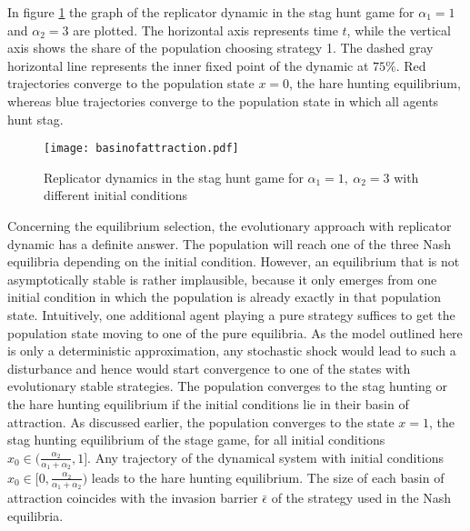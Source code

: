 In figure \ref{fig:basinofattraction} the graph of the replicator dynamic
in the stag hunt game for $\alpha_1=1$ and $\alpha_2=3$ are plotted. The
horizontal axis represents time $t$, while the vertical axis shows
the share of the population choosing strategy 1. The dashed gray horizontal
line represents the inner fixed point of the dynamic at $75\%$.
Red trajectories converge to the population state $x=0$, the hare hunting
equilibrium, whereas blue trajectories converge to the population state in 
which all agents hunt stag.
\begin{figure}
 \centering
        \texttt{[image: basinofattraction.pdf]}
        \caption[Replicator dynamic of the stag hunt game]{Replicator dynamics in the stag hunt game for 
                $\alpha_1=1,\ \alpha_2=3$ with different initial conditions}
                \label{fig:basinofattraction}
\end{figure}

Concerning the equilibrium selection, the evolutionary approach with replicator
dynamic has a definite answer. The population will reach one of the three
Nash equilibria depending on the initial condition. 
However, an equilibrium that is not asymptotically stable 
is rather implausible,
because it only emerges from one initial condition in which the population
is already exactly in that population state. 
Intuitively, one additional agent playing
a pure strategy suffices to get the population state moving to one of the
pure equilibria. As the model outlined here is only a deterministic
approximation, any stochastic shock would lead to such a disturbance and hence
would start convergence to one of the states with evolutionary stable 
strategies.
The population converges to the stag hunting or the hare
hunting equilibrium if the initial conditions lie in their 
basin of attraction.
As discussed earlier, the population converges to the state $x=1$, 
the stag hunting equilibrium of the stage game, for all initial conditions 
$x_0 \in (\frac{\alpha_2}{\alpha_1+\alpha_2},1]$. Any trajectory of the 
dynamical system with initial conditions 
$x_0 \in [0,\frac{\alpha_2}{\alpha_1+\alpha_2})$ leads to the hare hunting
equilibrium. The size of each basin of attraction coincides with the invasion 
barrier $\bar{\epsilon}$ of the strategy used in the Nash equilibria.

